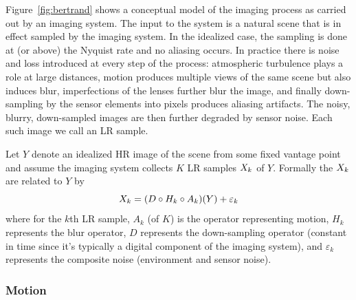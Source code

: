 Figure~\ref{fig:bertrand} shows a conceptual model of the imaging process as carried out by an imaging system.
%
The input to the system is a natural scene that is in effect sampled by the imaging system.
%
In the idealized case, the sampling is done at (or above) the Nyquist rate and no aliasing occurs.
%
In practice there is noise and loss introduced at every step of the process: atmospheric turbulence plays a role at large distances, motion produces multiple views of the same scene but also induces blur, imperfections of the lenses further blur the image, and finally down-sampling by the sensor elements into pixels produces aliasing artifacts.
%
The noisy, blurry, down-sampled images are then further degraded by sensor noise.
%
Each such image we call an LR sample.

Let \(Y\) denote an idealized HR image of the scene from some fixed vantage point and assume the imaging system collects \(K\) LR samples \(X_k\) of \(Y\).
%
Formally the \(X_k\) are related to \(Y\) by
\begin{equation}
	\Xk = (D \circ H_k \circ A_k) (Y) + \varepsilon_k
	\label{eqn:imagingmodel}
\end{equation}
where for the \(k\)th LR sample, \(A_k\) (of \(K\)) is the operator representing motion, \(H_k\) represents the blur operator, \(D\) represents the down-sampling operator (constant in time since it's typically a digital component of the imaging system), and \(\varepsilon_k\) represents the composite noise (environment and sensor noise).

\subsubsection{Motion}


